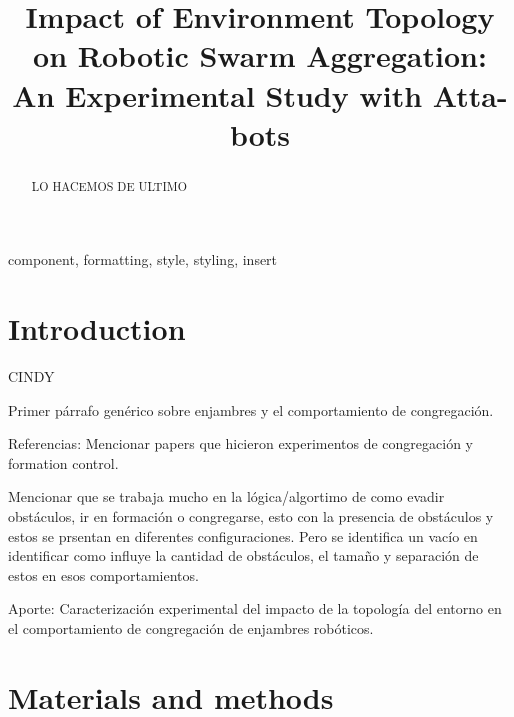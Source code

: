 \documentclass[conference]{IEEEtran}
\begin{document}
\title{Impact of Environment Topology on Robotic Swarm Aggregation: An Experimental Study with Atta-bots}

\author{
}


\maketitle

\begin{abstract}
LO HACEMOS DE ULTIMO

\end{abstract}

\begin{IEEEkeywords}
component, formatting, style, styling, insert
\end{IEEEkeywords}

\section{Introduction}
CINDY

Primer párrafo genérico sobre enjambres y el comportamiento de congregación.

Referencias: Mencionar papers que hicieron experimentos de congregación y formation control.

Mencionar que se trabaja mucho en la lógica/algortimo de como evadir obstáculos, ir en formación o congregarse, esto con la presencia de obstáculos y estos se prsentan en diferentes configuraciones. Pero se identifica un vacío en identificar como influye la cantidad de obstáculos, el tamaño y separación de estos en esos comportamientos.

Aporte: Caracterización experimental del impacto de la topología del entorno en el comportamiento de congregación de enjambres robóticos.

\section{Materials and methods}
\end{document}
